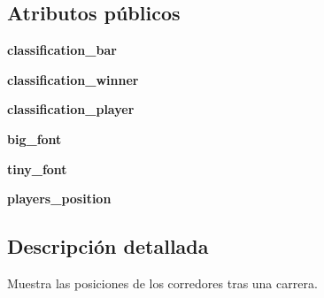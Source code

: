 \subsection*{\-Atributos públicos}
\begin{DoxyCompactItemize}
\item 
\hypertarget{classengine_1_1classificationmenu_1_1ClassificationMenu_ad0d5f0ed0e47608144e9296b1f861d36}{
{\bfseries classification\-\_\-bar}}
\label{classengine_1_1classificationmenu_1_1ClassificationMenu_ad0d5f0ed0e47608144e9296b1f861d36}

\item 
\hypertarget{classengine_1_1classificationmenu_1_1ClassificationMenu_aee1c2f162e31c0c2b314a295255c4460}{
{\bfseries classification\-\_\-winner}}
\label{classengine_1_1classificationmenu_1_1ClassificationMenu_aee1c2f162e31c0c2b314a295255c4460}

\item 
\hypertarget{classengine_1_1classificationmenu_1_1ClassificationMenu_a52daae4d57ba8202724d45c5f36bed0c}{
{\bfseries classification\-\_\-player}}
\label{classengine_1_1classificationmenu_1_1ClassificationMenu_a52daae4d57ba8202724d45c5f36bed0c}

\item 
\hypertarget{classengine_1_1classificationmenu_1_1ClassificationMenu_a180b2eb2776df739de7f0adb423d3966}{
{\bfseries big\-\_\-font}}
\label{classengine_1_1classificationmenu_1_1ClassificationMenu_a180b2eb2776df739de7f0adb423d3966}

\item 
\hypertarget{classengine_1_1classificationmenu_1_1ClassificationMenu_a2accae6bc3cb34e79438f481b829a0a6}{
{\bfseries tiny\-\_\-font}}
\label{classengine_1_1classificationmenu_1_1ClassificationMenu_a2accae6bc3cb34e79438f481b829a0a6}

\item 
\hypertarget{classengine_1_1classificationmenu_1_1ClassificationMenu_a4025446bc1ba5bd67c5882fecee9fe48}{
{\bfseries players\-\_\-position}}
\label{classengine_1_1classificationmenu_1_1ClassificationMenu_a4025446bc1ba5bd67c5882fecee9fe48}

\end{DoxyCompactItemize}


\subsection{\-Descripción detallada}
\-Muestra las posiciones de los corredores tras una carrera. 

